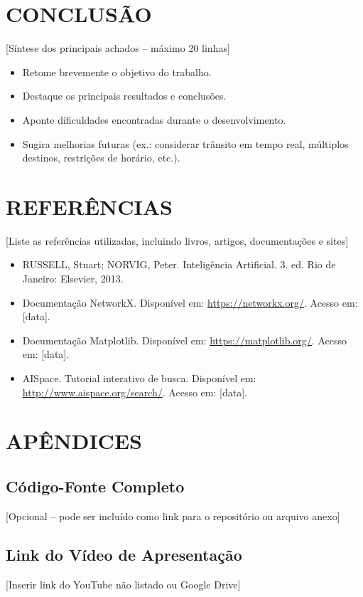 \documentclass[12pt,a4paper]{article}
\begin{document}
\section{CONCLUSÃO}

[Síntese dos principais achados – máximo 20 linhas]

\begin{itemize}
    \item Retome brevemente o objetivo do trabalho.
    \item Destaque os principais resultados e conclusões.
    \item Aponte dificuldades encontradas durante o desenvolvimento.
    \item Sugira melhorias futuras (ex.: considerar trânsito em tempo real, múltiplos destinos, restrições de horário, etc.).
\end{itemize}

\section{REFERÊNCIAS}

[Liste as referências utilizadas, incluindo livros, artigos, documentações e sites]

\begin{itemize}
    \item RUSSELL, Stuart; NORVIG, Peter. Inteligência Artificial. 3. ed. Rio de Janeiro: Elsevier, 2013.
    \item Documentação NetworkX. Disponível em: \url{https://networkx.org/}. Acesso em: [data].
    \item Documentação Matplotlib. Disponível em: \url{https://matplotlib.org/}. Acesso em: [data].
    \item AISpace. Tutorial interativo de busca. Disponível em: \url{http://www.aispace.org/search/}. Acesso em: [data].
\end{itemize}

\section{APÊNDICES}

\subsection{Código-Fonte Completo}
[Opcional – pode ser incluído como link para o repositório ou arquivo anexo]

\subsection{Link do Vídeo de Apresentação}
[Inserir link do YouTube não listado ou Google Drive]
\end{document}
